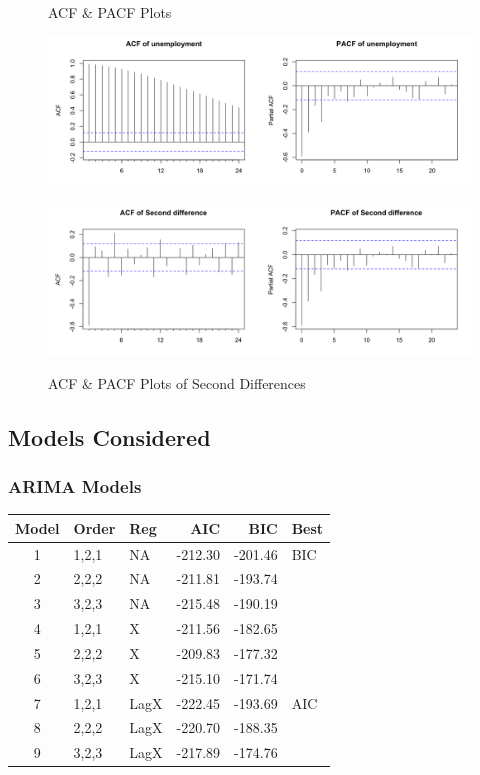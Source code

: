 \documentclass[twoside,twocolumn]{article}
\begin{document}
    \begin{figure}[H]
    	\centering
     	\caption{ACF \& PACF Plots}
     	\includegraphics[width=\linewidth]{images/acfpacf}
     	\label{fig:acfpacf}
     	\caption{ACF \& PACF Plots of Second Differences}
     	\includegraphics[width=\linewidth]{images/acfpacf2d}
     	\label{fig:acfpacf2}
      \end{figure}


\subsection{Models Considered}

\subsubsection{ARIMA Models}

\begin{table}[ht]
\centering
\begin{tabular}{cllrrl}
  \hline
 Model & Order & Reg  & AIC & BIC & Best \\ 
  \hline
1 & 1,2,1 &  NA &   -212.30 & -201.46 & BIC \\ 
  2  & 2,2,2 & NA   & -211.81 & -193.74 &  \\ 
  3  & 3,2,3 &  NA  & -215.48 & -190.19 &  \\ 
  4  & 1,2,1 & X  & -211.56 & -182.65 &  \\ 
  5  & 2,2,2 & X   & -209.83 & -177.32 &  \\ 
  6  & 3,2,3 & X   & -215.10 & -171.74 &  \\ 
  7  & 1,2,1 &  LagX & -222.45 & -193.69 & AIC \\ 
  8  & 2,2,2 &  LagX & -220.70 & -188.35 &  \\ 
  9  & 3,2,3 &  LagX & -217.89 & -174.76 &  \\ 
   \hline
\end{tabular}
\end{table}
\end{document}
